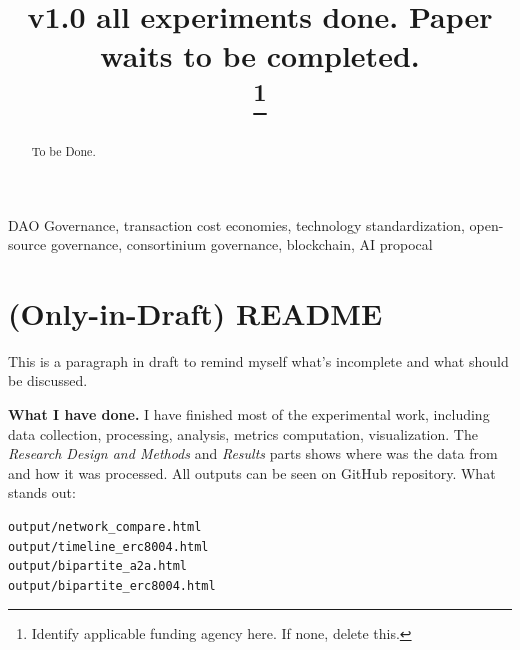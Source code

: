 \documentclass[conference]{IEEEtran}
\begin{document}
\title{v1.0 all experiments done. Paper waits to be completed.\\
\thanks{Identify applicable funding agency here. If none, delete this.}
}

\author{
\and
{}
}

\maketitle

\begin{abstract}
To be Done. 
\end{abstract}

\begin{IEEEkeywords}
DAO Governance, transaction cost economies, technology standardization, open-source governance, consortinium governance, blockchain, AI propocal
\end{IEEEkeywords}

\section{(Only-in-Draft) README}
This is a paragraph in draft to remind myself what's incomplete and what should be discussed. 

\textbf{What I have done.} I have finished most of the experimental work, including data collection, processing, analysis, metrics computation, visualization. The \textit{Research Design and Methods} and \textit{Results} parts shows where was the data from and how it was processed. All outputs can be seen on GitHub repository. What stands out: 

\begin{verbatim}
output/network_compare.html
output/timeline_erc8004.html
output/bipartite_a2a.html
output/bipartite_erc8004.html
\end{verbatim}
\end{document}

